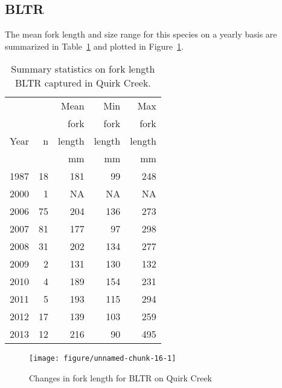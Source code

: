 \documentclass[]{article}\usepackage[]{graphicx}\usepackage[]{color}
\makeatletter
\def\maxwidth{ %
  \ifdim\Gin@nat@width>\linewidth
    \linewidth
  \else
    \Gin@nat@width
  \fi
}
\newenvironment{knitrout}{}{} %
\makeatother
\begin{document}
\clearpage %
\subsection{ BLTR}



The  mean fork length and size range for this species on a yearly basis are summarized in 
Table~\ref{tab:fishsummaryBLTR} 
and plotted in 
Figure~\ref{fig:fishsummaryBLTR}.

\begin{table}[h]
\centering
\captionsetup{width=.9\linewidth}
\caption{Summary statistics on fork length BLTR captured in Quirk Creek.}
\label{tab:fishsummaryBLTR}
\begin{tabular}{| l | r r r r | } \hline
           &           &  Mean   &  Min     & Max     \\
           &           &  fork   &  fork    & fork    \\
Year       &   n       &  length &  length  & length  \\
           &           & mm      &  mm      &  mm     \\ \hline
1987  &  18  &  181  &  99  &  248 \\ 
2000  &  1  &  NA  &  NA  &  NA \\ 
2006  &  75  &  204  &  136  &  273 \\ 
2007  &  81  &  177  &  97  &  298 \\ 
2008  &  31  &  202  &  134  &  277 \\ 
2009  &  2  &  131  &  130  &  132 \\ 
2010  &  4  &  189  &  154  &  231 \\ 
2011  &  5  &  193  &  115  &  294 \\ 
2012  &  17  &  139  &  103  &  259 \\ 
2013  &  12  &  216  &  90  &  495 \\ 
\hline 

\end{tabular}
\end{table}

\begin{figure}[h]
\begin{center}
\begin{knitrout}
\color{fgcolor}
\texttt{[image: figure/unnamed-chunk-16-1]} 

\end{knitrout}
\end{center}
\caption{Changes in fork length for BLTR on Quirk Creek}
\label{fig:fishsummaryBLTR}
\end{figure}
\end{document}
